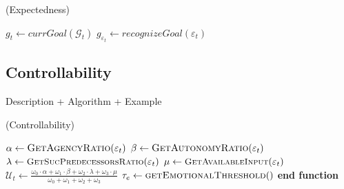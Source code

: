 \documentclass[letterpaper]{article}
\begin{document}
\begin{algorithm}
	\caption{(Expectedness)}
	\label{alg:expectedness}
	\begin{algorithmic}[1]
			\Statex
			\State $\mathit{g}_{t} \gets \textit{currGoal}{(\mathcal{G}_{t})}$
			\State $\mathit{g}_{\varepsilon_t} \gets \textit{recognizeGoal}{(\varepsilon_t)}$
			\Statex
				\State {}
			\EndIf
			\Statex
				\State {}
			\Else
					\State {}
				\Else
							\State {}
						\Else
							\State {}
						\EndIf
					\Else
							\State {}
						\Else
								\State {}
							\Else
								\State {}
							\EndIf
						\EndIf
					\EndIf
				\EndIf
			\EndIf
		\EndFunction
	\end{algorithmic}
\end{algorithm}

\subsection{Controllability}

Description + Algorithm + Example

\begin{algorithm}
	\caption{(Controllability)}
	\label{alg:controllability}
	\begin{algorithmic}[1]
			\Statex
			\State $\alpha \gets \Call{GetAgencyRatio}{\varepsilon_t}$ 
			\State $\beta \gets \Call{GetAutonomyRatio}{\varepsilon_t}$
			\Statex
			\State $\lambda \gets
			\Call{\small{GetSucPredecessorsRatio}}{\varepsilon_t}$
			\State $\mu \gets
			\Call{\small{GetAvailableInput}}{\varepsilon_t}$
			\Statex
			\State $\mathcal{U}_{t} \gets
			\frac{\omega_{0}\cdot \alpha + \omega_{1}\cdot \beta + \omega_{2}\cdot
			\lambda + \omega_{3}\cdot \mu}{\omega_{0} + \omega_{1} + \omega_{2} +
			\omega_{3}}$
			\Statex
			\State $\tau_{e} \gets \Call{getEmotionalThreshold}{ }$
			\Statex
				\State {}
			\Else
				\State {}
			\EndIf
		\EndFunction
		\State \textbf{end function}
	\end{algorithmic}
\end{algorithm}
\end{document}
